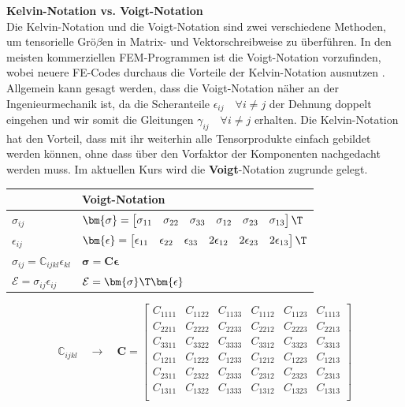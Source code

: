 \begin{framed}
\textbf{Kelvin-Notation vs. Voigt-Notation}\\
Die Kelvin-Notation und die Voigt-Notation sind zwei verschiedene Methoden, um tensorielle Grö$\beta$en in Matrix- und Vektorschreibweise zu überführen. In den meisten kommerziellen FEM-Programmen ist die Voigt-Notation vorzufinden, wobei neuere FE-Codes durchaus die Vorteile der Kelvin-Notation ausnutzen \cite{nagel2016advantages}. Allgemein kann gesagt werden, dass die Voigt-Notation näher an der Ingenieurmechanik ist, da die Scheranteile $\epsilon_{ij} \quad \forall i\neq j$ der Dehnung doppelt eingehen und wir somit die Gleitungen $\gamma_{ij} \quad \forall i\neq j$ erhalten. Die Kelvin-Notation hat den Vorteil, dass mit ihr weiterhin alle Tensorprodukte einfach gebildet werden können, ohne dass über den Vorfaktor der Komponenten nachgedacht werden muss. Im aktuellen Kurs wird die \textbf{Voigt}-Notation zugrunde gelegt.

\bigskip\noindent
\begin{tabular}{p{}p{}}
\toprule
 & Voigt-Notation \\
\hline
$\sigma_{ij}$ & $\bm{\sigma}= \begin{bmatrix} \sigma_{11} & \sigma_{22} & \sigma_{33} & \sigma_{12} & \sigma_{23} & \sigma_{13} \end{bmatrix}\T$ \\
$\epsilon_{ij}$ & $\bm{\epsilon}= \begin{bmatrix} \epsilon_{11} & \epsilon_{22} & \epsilon_{33} & 2\epsilon_{12} & 2\epsilon_{23} & 2\epsilon_{13} \end{bmatrix}\T$ \\
$\sigma_{ij}=\mathbb{C}_{ijkl}\epsilon_{kl}$ & $\bm{\sigma} = \bm{C} \bm{\epsilon}$ \\
$\mathcal{E}=\sigma_{ij}\epsilon_{ij}$ & $\mathcal{E} = \bm{\sigma}\T\bm{\epsilon}$ \\
\bottomrule
\end{tabular}

\bigskip\begin{equation}
\mathbb{C}_{ijkl} \quad \rightarrow \quad \bm{C}=\begin{bmatrix}
C_{1111} & C_{1122} & C_{1133} & C_{1112} & C_{1123} & C_{1113} \\
C_{2211} & C_{2222} & C_{2233} & C_{2212} & C_{2223} & C_{2213} \\
C_{3311} & C_{3322} & C_{3333} & C_{3312} & C_{3323} & C_{3313} \\
C_{1211} & C_{1222} & C_{1233} & C_{1212} & C_{1223} & C_{1213} \\
C_{2311} & C_{2322} & C_{2333} & C_{2312} & C_{2323} & C_{2313} \\
C_{1311} & C_{1322} & C_{1333} & C_{1312} & C_{1323} & C_{1313} \\ 
\end{bmatrix}
\end{equation}


\end{framed}
